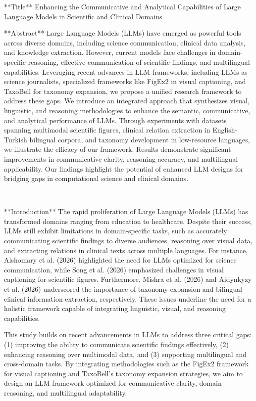 **Title**  
Enhancing the Communicative and Analytical Capabilities of Large Language Models in Scientific and Clinical Domains  

**Abstract**  
Large Language Models (LLMs) have emerged as powerful tools across diverse domains, including science communication, clinical data analysis, and knowledge extraction. However, current models face challenges in domain-specific reasoning, effective communication of scientific findings, and multilingual capabilities. Leveraging recent advances in LLM frameworks, including LLMs as science journalists, specialized frameworks like FigEx2 in visual captioning, and TaxoBell for taxonomy expansion, we propose a unified research framework to address these gaps. We introduce an integrated approach that synthesizes visual, linguistic, and reasoning methodologies to enhance the semantic, communicative, and analytical performance of LLMs. Through experiments with datasets spanning multimodal scientific figures, clinical relation extraction in English-Turkish bilingual corpora, and taxonomy development in low-resource languages, we illustrate the efficacy of our framework. Results demonstrate significant improvements in communicative clarity, reasoning accuracy, and multilingual applicability. Our findings highlight the potential of enhanced LLM designs for bridging gaps in computational science and clinical domains.

---

**Introduction**  
The rapid proliferation of Large Language Models (LLMs) has transformed domains ranging from education to healthcare. Despite their success, LLMs still exhibit limitations in domain-specific tasks, such as accurately communicating scientific findings to diverse audiences, reasoning over visual data, and extracting relations in clinical texts across multiple languages. For instance, Alshomary et al. (2026) highlighted the need for LLMs optimized for science communication, while Song et al. (2026) emphasized challenges in visual captioning for scientific figures. Furthermore, Mishra et al. (2026) and Aidynkyzy et al. (2026) underscored the importance of taxonomy expansion and bilingual clinical information extraction, respectively. These issues underline the need for a holistic framework capable of integrating linguistic, visual, and reasoning capabilities.

This study builds on recent advancements in LLMs to address three critical gaps: (1) improving the ability to communicate scientific findings effectively, (2) enhancing reasoning over multimodal data, and (3) supporting multilingual and cross-domain tasks. By integrating methodologies such as the FigEx2 framework for visual captioning and TaxoBell's taxonomy expansion strategies, we aim to design an LLM framework optimized for communicative clarity, domain reasoning, and multilingual adaptability.

